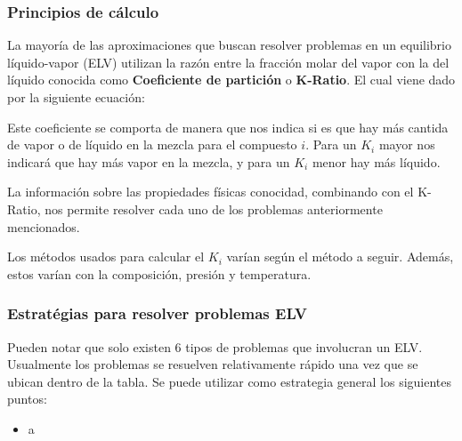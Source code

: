 \subsubsection{Principios de cálculo}

La mayoría de las aproximaciones que buscan resolver problemas en un equilibrio líquido-vapor (ELV) utilizan la razón entre la fracción molar del vapor con la del líquido
conocida como \textbf{Coeficiente de partición} o \textbf{K-Ratio}. El cual viene dado por la siguiente ecuación:


Este coeficiente se comporta de manera que nos indica si es que hay más cantida de vapor o de líquido en la mezcla para el compuesto $i$. 
Para un $K_i$ mayor nos indicará que hay más vapor en la mezcla, y para un $K_i$ menor hay más líquido.

La información sobre las propiedades físicas conocidad, combinando con el K-Ratio, nos permite resolver cada uno de los problemas anteriormente mencionados.

Los métodos usados para calcular el $K_i$ varían según el método a seguir. Además, estos varían con la composición, presión y temperatura.

\subsubsection{Estratégias para resolver problemas ELV}

Pueden notar que solo existen 6 tipos de problemas que involucran un ELV. Usualmente los problemas se resuelven relativamente rápido una vez
que se ubican dentro de la tabla. Se puede utilizar como estrategia general los siguientes puntos:

\begin{itemize}
    \item a
\end{itemize}